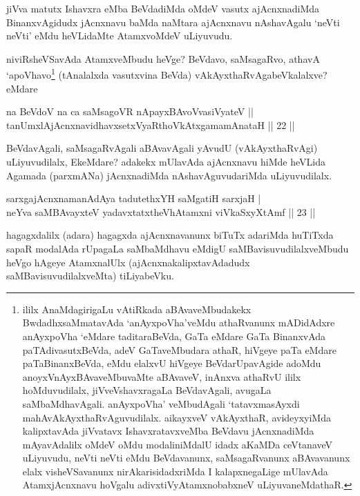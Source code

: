\begin{artha}
jiVva matutx Ishavxra eMba BeVdadiMda oMdeV vasutx ajAcnxnadiMda BinanxvAgidudx jAcnxnavu baMda naMtara ajAcnxnavu nAshavAgalu `neVti neVti' eMdu heVLidaMte AtamxvoMdeV uLiyuvudu. 

niviRsheVSavAda AtamxveMbudu heVge? BeVdavo, saMsagaRvo, athavA `apoVhavo\footnote{ililx AnaMdagirigaLu vAtiRkada aBAvaveMbudakekx BwdadhxsaMmatavAda `anAyxpoVha'veMdu athaRvanunx mADidAdxre anAyxpoVha `eMdare taditaraBeVda, GaTa eMdare GaTa BinanxvAda paTAdivasutxBeVda, adeV GaTaveMbudara athaR, hiVgeye paTa eMdare paTaBinanxBeVda, eMdu elalxvU hiVgeye BeVdarUpavAgide adoMdu anoyxVnAyxBAvaveMbuvaMte aBAvaveV, inAnxva athaRvU ililx hoMduvudilalx, jiVveVshavxragaLa BeVdavAgali, avugaLa saMbaMdhavAgali. anAyxpoVha' veMbudAgali `tatavxmasAyxdi mahAvAkAyxthaRvAguvudilalx. aikayxveV vAkAyxthaR, avideyxyiMda kalipxtavAda jiVvatavx IshavxratavxveMba BeVdavu jAcnxnadiMda mAyavAdalilx oMdeV oMdu modaliniMdalU idadx aKaMDa ceVtanaveV uLiyuvudu, neVti neVti eMdu BeVdavanunx, saMsagaRvanunx aBAvavanunx elalx visheVSavanunx nirAkarisidadxriMda I kalapxnegaLige mUlavAda AtamxjAcnxnavu hoVgalu adivxtiVyAtamxnobabxneV uLiyuvaneMdathaR.} (tAnalalxda vasutxvina BeVda) vAkAyxthaRvAgabeVkalalxve? eMdare \mdash 
\end{artha}

\begin{shl}
na BeVdoV na ca saMsagoVR nApayxBAvoV\s vasiVyateV ||  \\
tanUmxlAjAcnxnavidhavxsetxVyaRthoVkAtxgamamAnataH \hfill||  22 || 
\end{shl}

\begin{artha}
BeVdavAgali, saMsagaRvAgali aBAvavAgali yAvudU (vAkAyxthaRvAgi) uLiyuvudilalx, EkeMdare? adakekx mUlavAda ajAcnxnavu hiMde heVLida Agamada (parxmANa) jAcnxnadiMda nAshavAguvudariMda uLiyuvudilalx.
\end{artha}



\begin{shl}
sarxgajAcnxnamanAdAya tadutethxYH saMgatiH sarxjaH  | \\
neYva saMBAvayxteV yadavxtatxtheVhA\s \s tamxni viVkaSxyXtAmf \hfill||  23 ||  
\end{shl}

\begin{artha}
hagagxdalilx (adara) hagagxda ajAcnxnavanunx biTuTx adariMda huTiTxda sapaR modalAda rUpagaLa saMbaMdhavu eMdigU saMBavisuvudilalxveMbudu heVgo hAgeye AtamxnalUlx (ajAcnxnakalipxtavAdadudx saMBavisuvudilalxveMta) tiLiyabeVku.
\end{artha}

